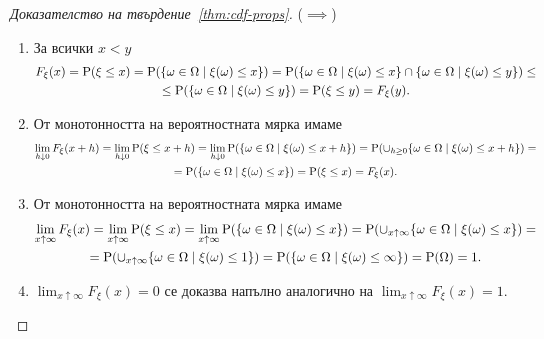 \documentclass[numbers=endperiod, DIV=15, bibliography=totocnumbered]{scrartcl}
\begin{document}
\begin{proof}[Доказателство на твърдение~\ref{thm:cdf-props}]
  ($\implies$)
  \begin{enumerate}
    \item За всички $x < y$
    \begin{multline*}
      F_\xi(x)
      =
      \operatorname{P}(\xi \leq x)
      =
      \operatorname{P}(\{ \omega \in \Omega \mid \xi(\omega) \leq x \})
      =
      \operatorname{P}(\{ \omega \in \Omega \mid \xi(\omega) \leq x \} \cap \{ \omega \in \Omega \mid \xi(\omega) \leq y \})
      \leq \\ \leq
      \operatorname{P}(\{ \omega \in \Omega \mid \xi(\omega) \leq y \})
      =
      \operatorname{P}(\xi \leq y)
      =
      F_\xi(y).
    \end{multline*}

    \item От монотонността на вероятностната мярка имаме
    \begin{multline*}
      \lim_{h \downarrow 0} F_\xi(x + h)
      =
      \lim_{h \downarrow 0} \operatorname{P}(\xi \leq x + h)
      =
      \lim_{h \downarrow 0} \operatorname{P}(\{ \omega \in \Omega \mid \xi(\omega) \leq x + h \})
      =
      \operatorname{P}(\cup_{h \geq 0} \{ \omega \in \Omega \mid \xi(\omega) \leq x + h \})
      = \\ =
      \operatorname{P}(\{ \omega \in \Omega \mid \xi(\omega) \leq x \})
      =
      \operatorname{P}(\xi \leq x)
      =
      F_\xi(x).
    \end{multline*}

    \item От монотонността на вероятностната мярка имаме
    \begin{multline*}
      \lim_{x \uparrow \infty} F_\xi(x)
      =
      \lim_{x \uparrow \infty} \operatorname{P}(\xi \leq x)
      =
      \lim_{x \uparrow \infty} \operatorname{P}(\{ \omega \in \Omega \mid \xi(\omega) \leq x \})
      =
      \operatorname{P}(\cup_{x \uparrow \infty} \{ \omega \in \Omega \mid \xi(\omega) \leq x \})
      = \\ =
      \operatorname{P}(\cup_{x \uparrow \infty} \{ \omega \in \Omega \mid \xi(\omega) \leq 1 \})
      =
      \operatorname{P}(\{ \omega \in \Omega \mid \xi(\omega) \leq \infty \})
      =
      \operatorname{P}(\Omega)
      =
      1.
    \end{multline*}

    \item $\lim_{x \uparrow \infty} F_\xi(x) = 0$ се доказва напълно аналогично на $\lim_{x \uparrow \infty} F_\xi(x) = 1$.
  \end{enumerate}


\end{proof}
\end{document}
